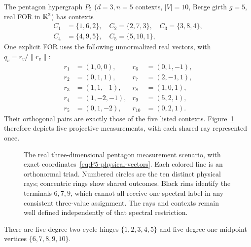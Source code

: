 \documentclass[aps,pra,reprint,superscriptaddress,longbibliography,nofootinbib,floatfix,10pt]{revtex4-2}
\theoremstyle{definition}\newtheorem{definition}[theorem]{Definition}
\theoremstyle{remark}\newtheorem{remark}[theorem]{Remark}
\begin{document}
The pentagon hypergraph $P_5$ ($d=3,n=5$ contexts, $|V|=10$, Berge girth $g=5$, real FOR in $\mathbb R^3$) has contexts
\begin{equation}\label{eq:P5-contexts}
\begin{aligned}
C_1&=\{1,6,2\},\quad C_2=\{2,7,3\},\quad C_3=\{3,8,4\},\\
C_4&=\{4,9,5\},\quad C_5=\{5,10,1\},
\end{aligned}
\end{equation}
One explicit FOR uses the following unnormalized real vectors, with $q_v=r_v/\|r_v\|$:
\begin{equation}\label{eq:P5-physical-vectors}
\begin{aligned}
r_1&=(1,0,0),&r_6&=(0,1,-1),\\
r_2&=(0,1,1),&r_7&=(2,-1,1),\\
r_3&=(1,1,-1),&r_8&=(1,0,1),\\
r_4&=(1,-2,-1),&r_9&=(5,2,1),\\
r_5&=(0,1,-2),&r_{10}&=(0,2,1).
\end{aligned}
\end{equation}
Their orthogonal pairs are exactly those of the five listed contexts. Figure~\ref{fig:physical-pentagon} therefore depicts five projective measurements, with each shared ray represented once.
\begin{figure}[!tbp]
\centering

\caption{The real three-dimensional pentagon measurement scenario, with exact coordinates~\eqref{eq:P5-physical-vectors}. Each colored line is an orthonormal triad. Numbered circles are the ten distinct physical rays; concentric rings show shared outcomes. Black rims identify the terminals $6,7,9$, which cannot all receive one spectral label in any consistent three-value assignment. The rays and contexts remain well defined independently of that spectral restriction.}\label{fig:physical-pentagon}
\end{figure}


There are five degree-two cycle hinges $\{1,2,3,4,5\}$ and five degree-one midpoint vertices $\{6,7,8,9,10\}$.
\end{document}

